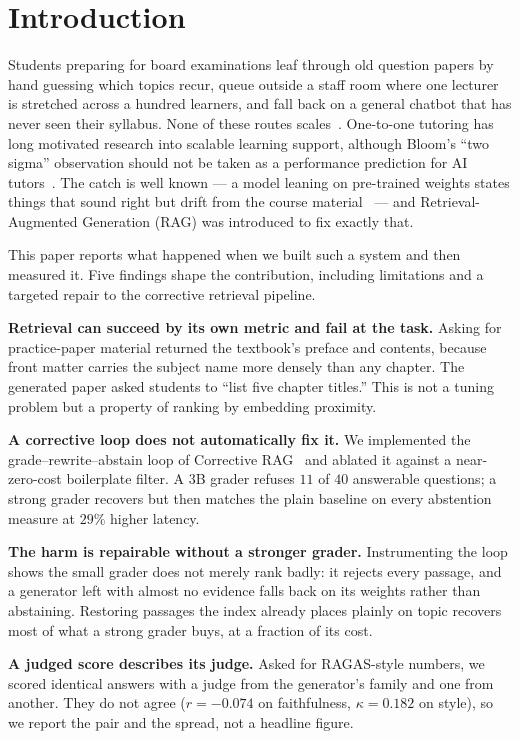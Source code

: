 \documentclass[conference]{IEEEtran}
\begin{document}
\section{Introduction}
Students preparing for board examinations leaf through old question papers by
hand guessing which topics recur, queue outside a staff room where one lecturer
is stretched across a hundred learners, and fall back on a general chatbot that
has never seen their syllabus. None of these routes
scales~\cite{lauber2025}. One-to-one tutoring has long motivated research into scalable learning
support, although Bloom's ``two sigma'' observation should not be taken as a
performance prediction for AI tutors~\cite{bloom1984,vanlehn2011}.
The catch is well known --- a model leaning on pre-trained weights states things
that sound right but drift from the course material~\cite{lewis2020} --- and
Retrieval-Augmented Generation (RAG) was introduced to fix exactly that.

This paper reports what happened when we built such a system and then measured
it. Five findings shape the contribution, including limitations and a targeted
repair to the corrective retrieval pipeline.

\textbf{Retrieval can succeed by its own metric and fail at the task.} Asking
for practice-paper material returned the textbook's preface and contents,
because front matter carries the subject name more densely than any chapter.
The generated paper asked students to ``list five chapter titles.'' This is not
a tuning problem but a property of ranking by embedding proximity.

\textbf{A corrective loop does not automatically fix it.} We implemented the
grade--rewrite--abstain loop of Corrective RAG~\cite{yan2024crag} and ablated
it against a near-zero-cost boilerplate filter. A $3$B grader refuses $11$ of
$40$ answerable questions; a strong grader recovers but then matches the plain
baseline on every abstention measure at $29\%$ higher latency.

\textbf{The harm is repairable without a stronger grader.} Instrumenting the
loop shows the small grader does not merely rank badly: it rejects every
passage, and a generator left with almost no evidence falls back on its weights
rather than abstaining. Restoring passages the index already places plainly on
topic recovers most of what a strong grader buys, at a fraction of its cost.

\textbf{A judged score describes its judge.} Asked for RAGAS-style numbers, we
scored identical answers with a judge from the generator's family and one from
another. They do not agree ($r = -0.074$ on faithfulness, $\kappa = 0.182$ on
style), so we report the pair and the spread, not a headline figure.
\end{document}
